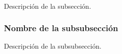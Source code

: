 
Descripción de la subsección.

\subsubsection{Nombre de la subsubsección}
\label{sec:nombreSubsubseccion}
Descripción de la subsubsección.

